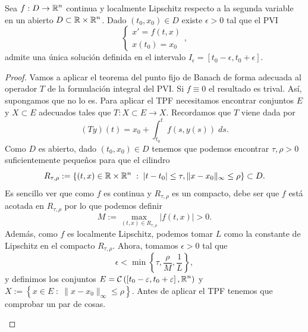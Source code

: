 \begin{theorem}
Sea $\displaystyle f : D \to \mathbb{R}^{n} $ continua y localmente Lipschitz respecto a la segunda variable en un abierto $\displaystyle D \subset \mathbb{R} \times \mathbb{R}^{n} $. Dado $\displaystyle \left(t_{0}, x_{0}\right)\in D $ existe $\displaystyle \epsilon > 0 $ tal que el PVI
\[
\begin{cases}
x' = f\left(t,x\right) \\
x\left(t_{0}\right)=x_{0}
\end{cases}
,\]
admite una única solución definida en el intervalo $\displaystyle I_{\epsilon } =\left[t_{0}-\epsilon , t_{0} + \epsilon \right]  $. 
\end{theorem}
\begin{proof}
Vamos a aplicar el teorema del punto fijo de Banach de forma adecuada al operador $\displaystyle T $ de la formulación integral del PVI. Si $\displaystyle f \equiv 0 $ el resultado es trival. Así, supongamos que no lo es. Para aplicar el TPF necesitamos encontrar conjuntos $\displaystyle E $ y $\displaystyle X \subset E $ adecuados tales que $\displaystyle T : X \subset E \to X$. Recordamos que $\displaystyle T $ viene dada por
\[\left(Ty\right)\left(t\right)=x_{0} + \int^{t}_{t_{0}} f\left(s, y\left(s\right)\right) \; d s .\]
Como $\displaystyle D $ es abierto, dado $\displaystyle \left(t_{0}, x_{0}\right)\in D $ tenemos que podemos encontrar $\displaystyle \tau, \rho > 0 $ suficientemente pequeños para que el cilindro
\[R_{\tau, \rho} := \left\{ \left(t,x\right)\in \mathbb{R} \times \mathbb{R}^{n} \; : \; \left|t-t_{0}\right|\leq \tau, \|x-x_{0}\|_{\infty}\leq \rho\right\} \subset D .\]
Es sencillo ver que como $\displaystyle f $ es continua y $\displaystyle R_{\tau, \rho} $ es un compacto, debe ser que $\displaystyle f $ está acotada en $\displaystyle R_{\tau, \rho} $ por lo que podemos definir
\[M := \max_{\left(t,x\right)\in R_{\tau, \rho}} \left|f\left(t,x\right)\right|>0 .\]
Además, como $\displaystyle f $ es localmente Lipschitz, podemos tomar $\displaystyle L $ como la constante de Lipschitz en el compacto $\displaystyle R_{\tau, \rho} $. Ahora, tomamos $\displaystyle \epsilon >0 $ tal que 
\[\epsilon < \min \left\{ \tau, \frac{\rho}{M}, \frac{1}{L}\right\}  ,\]
y definimos los conjuntos $\displaystyle E = \mathcal{C}\left(\left[t_{0}-\varepsilon, t_{0} + \varepsilon \right] , \mathbb{R}^{n}\right) $ y $\displaystyle X := \left\{ x \in E \; : \; \|x-x_{0}\|_{\infty } \leq \rho\right\}  $. Antes de aplicar el TPF tenemos que comprobar un par de cosas.
\begin{itemize}

\end{itemize}
\end{proof}
